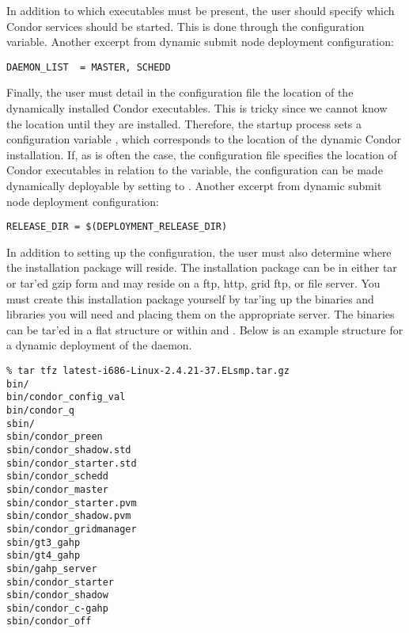 In addition to which executables must be present, the user should
specify which Condor services should be started.  This is done through
the  configuration variable.  Another excerpt
from dynamic submit node deployment configuration:

\footnotesize
\begin{verbatim}
DAEMON_LIST  = MASTER, SCHEDD
\end{verbatim}
\normalsize

Finally, the user must detail in the configuration file the location
of the dynamically installed Condor executables.  This is tricky since
we cannot know the location until they are installed.  Therefore, the
startup process sets a configuration variable
, which corresponds to the location of
the dynamic Condor installation.  If, as is often the case, the
configuration file specifies the location of Condor executables in
relation to the  variable, the configuration can
be made dynamically deployable by setting  to
.  Another excerpt from dynamic
submit node deployment configuration:

\footnotesize
\begin{verbatim}
RELEASE_DIR = $(DEPLOYMENT_RELEASE_DIR)
\end{verbatim}
\normalsize

In addition to setting up the configuration, the user must also
determine where the installation package will reside.  The
installation package can be in either tar or tar'ed gzip form and may
reside on a ftp, http, grid ftp, or file server.  You must create this
installation package yourself by tar'ing up the binaries and libraries
you will need and placing them on the appropriate server.  The
binaries can be tar'ed in a flat structure or within  and
.  Below is an example structure for a dynamic deployment
of the  daemon.

\footnotesize
\begin{verbatim}
% tar tfz latest-i686-Linux-2.4.21-37.ELsmp.tar.gz
bin/
bin/condor_config_val
bin/condor_q
sbin/
sbin/condor_preen
sbin/condor_shadow.std
sbin/condor_starter.std
sbin/condor_schedd
sbin/condor_master
sbin/condor_starter.pvm
sbin/condor_shadow.pvm
sbin/condor_gridmanager
sbin/gt3_gahp
sbin/gt4_gahp
sbin/gahp_server
sbin/condor_starter
sbin/condor_shadow
sbin/condor_c-gahp
sbin/condor_off 
\end{verbatim}
\normalsize
